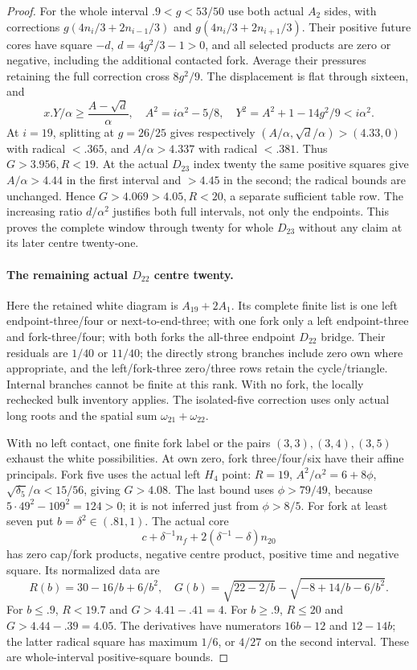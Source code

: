 \documentclass[11pt]{article}
\theoremstyle{definition}
\theoremstyle{remark}
\begin{document}
\begin{proof}
For the whole interval $.9<g<53/50$ use both actual $A_2$ sides,
with corrections $g(4n_i/3+2n_{i-1}/3)$ and
$g(4n_i/3+2n_{i+1}/3)$. Their positive future cores have square
$-d$, $d=4g^2/3-1>0$, and all selected products are zero or
negative, including the additional contacted fork. Average their
pressures retaining the full correction cross $8g^2/9$.
The displacement is flat through sixteen, and
\[
 x.Y/\alpha\ge{\frac{A-\sqrt d}{\alpha}},\quad
 A^2=i\alpha^2-5/8,\quad
 Y^2=A^2+1-14g^2/9<i\alpha^2.
\]
At $i=19$, splitting at $g=26/25$ gives respectively
$(A/\alpha,\sqrt d/\alpha)>(4.33,0)$ with radical $<.365$,
and $A/\alpha>4.337$ with radical $<.381$. Thus $G>3.956,R<19$.
At the actual $D_{23}$ index twenty the same positive squares give
$A/\alpha>4.44$ in the first interval and $>4.45$ in the second;
the radical bounds are unchanged. Hence $G>4.069>4.05,R<20$,
a separate sufficient table row. The increasing ratio $d/\alpha^2$
justifies both full intervals, not only the endpoints. This proves
the complete window through twenty for whole $D_{23}$ without any
claim at its later centre twenty-one.

\paragraph{The remaining actual $D_{22}$ centre twenty.}
Here the retained white diagram is $A_{19}+2A_1$. Its complete
finite list is one left endpoint-three/four or next-to-end-three;
with one fork only a left endpoint-three and fork-three/four;
with both forks the all-three endpoint $D_{22}$ bridge.
Their residuals are $1/40$ or $11/40$; the directly strong
branches include zero own where appropriate, and the left/fork-three
zero/three rows retain the cycle/triangle. Internal branches cannot
be finite at this rank. With no fork, the locally rechecked bulk
inventory applies. The isolated-five correction uses only actual
long roots and the spatial sum $\omega_{21}+\omega_{22}$.

With no left contact, one finite fork label or the pairs
$(3,3),(3,4),(3,5)$ exhaust the white possibilities. At own zero,
fork three/four/six have their affine principals. Fork five uses
the actual left $H_4$ point: $R=19$, $A^2/\alpha^2=6+8\phi$,
$\sqrt{\delta_5}/\alpha<15/56$, giving $G>4.08$.
The last bound uses $\phi>79/49$, because
$5\cdot49^2-109^2=124>0$; it is not inferred just from $\phi>8/5$.
For fork at least seven put $b=\delta^2\in(.81,1)$. The actual core
\[
 c+\delta^{-1}n_f+2(\delta^{-1}-\delta)n_{20}
\]
has zero cap/fork products, negative centre product, positive time
and negative square. Its normalized data are
\[
 R(b)=30-16/b+6/b^2,\quad
 G(b)=\sqrt{22-2/b}-\sqrt{-8+14/b-6/b^2}.
\]
For $b\le.9$, $R<19.7$ and $G>4.41-.41=4$.
For $b\ge.9$, $R\le20$ and $G>4.44-.39=4.05$.
The derivatives have numerators $16b-12$ and $12-14b$;
the latter radical square has maximum $1/6$, or $4/27$ on the
second interval. These are whole-interval positive-square bounds.


\end{proof}
\end{document}
